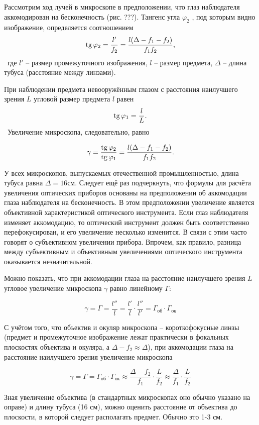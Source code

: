 Рассмотрим ход лучей в микроскопе в предположении, что глаз наблюдателя аккомодирован на
бесконечность (рис. ???). Тангенс угла $\varphi_2$ , под которым видно изображение, определяется
соотношением
\
\begin{equation}\label{eq::5}
  \mathop{\mathrm{tg}}\nolimits \varphi_2 = \frac{l'}{f_2} = \frac{l(\Delta - f_1 - f_2)}{f_1 f_2},
\end{equation}
\
где $l'$ -- размер промежуточного изображения, $l$ -- размер предмета, $\Delta$ -- длина тубуса 
(расстояние между линзами).

При наблюдении предмета невооружённым глазом с расстояния наилучшего зрения $L$ угловой размер 
предмета $l$ равен
\
\begin{equation}
  \mathop{\mathrm{tg}}\nolimits \varphi_1 = \frac{l}{L}.
\end{equation}
\
Увеличение микроскопа, следовательно, равно

\begin{equation}
  \gamma = \frac{\mathop{\mathrm{tg}}\nolimits \varphi_2}{\mathop{\mathrm{tg}}\nolimits \varphi_1} = \frac{l(\Delta - f_1 - f_2)}{f_1 f_2}.
\end{equation}

У всех микроскопов, выпускаемых отечественной промышленностью, длина тубуса равна $\Delta = 16$см.
Следует ещё раз подчеркнуть, что формулы для расчёта увеличения оптических приборов основаны на 
предположении об аккомодации глаза наблюдателя на бесконечность. В этом предположении увеличение 
является объективной характеристикой оптического инструмента. Если глаз наблюдателя изменяет 
аккомодацию, то оптический инструмент должен быть соответственно перефокусирован, и его увеличение 
несколько изменится. В связи с этим часто говорят о субъективном увеличении прибора. Впрочем, 
как правило, разница между субъективным и объективным увеличениями оптического
инструмента оказывается незначительной.

Можно показать, что при аккомодации глаза на расстояние наилучшего зрения $L$ угловое увеличение 
микроскопа $\gamma$ равно линейному $\Gamma$:

\begin{equation}
  \gamma = \Gamma = \frac{l''}{l} = \frac{l'}{l} \cdot \frac{l''}{l'} = 
  \Gamma_{\text{об}} \cdot \Gamma_{\text{ок}}
\end{equation}

С учётом того, что объектив и окуляр микроскопа -- короткофокусные линзы (предмет и промежуточное
изображение лежат практически в фокальных плоскостях объектива и окуляра, а 
$\Delta - f_2 \approx \Delta$), при аккомодации глаза на расстояние наилучшего зрения увеличение 
микроскопа

\begin{equation}
  \gamma = \Gamma = \Gamma_{\text{об}} \cdot \Gamma_{\text{ок}} \approx 
  \frac{\Delta - f_2}{f_1} \cdot \frac{L}{f_2} \approx \frac{\Delta}{f_1} \cdot \frac{L}{f_2}
\end{equation}

Зная увеличение объектива (в стандартных микроскопах оно обычно указано на оправе) и длину тубуса 
(16 см), можно оценить расстояние от объектива до плоскости, в которой следует располагать предмет. 
Обычно это 1-3 см.